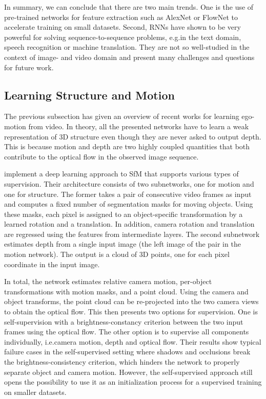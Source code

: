 			In summary, we can conclude that there are two main trends.
			One is the use of pre-trained networks for feature extraction such as AlexNet or FlowNet to accelerate training on small datasets.
			Second, RNNs have shown to be very powerful for solving sequence-to-sequence problems, e.g.\@ in the text domain, speech recognition or machine translation.
			They are not so well-studied in the context of image- and video domain and present many challenges and questions for future work.
		
		\subsection{Learning Structure and Motion}
			The previous subsection has given an overview of recent works for learning ego-motion from video.
			In theory, all the presented networks have to learn a weak representation of 3D structure even though they are never asked to output depth.
			This is because motion and depth are two highly coupled quantities that both contribute to the optical flow in the observed image sequence.
			
			\cite{SFMNET} implement a deep learning approach to SfM that supports various types of supervision. 
			Their architecture consists of two subnetworks, one for motion and one for structure.
			The former takes a pair of consecutive video frames as input and computes a fixed number of segmentation masks for moving objects. 
			Using these masks, each pixel is assigned to an object-specific transformation by a learned rotation and a translation.
			In addition, camera rotation and translation are regressed using the features from intermediate layers.
			The second subnetwork estimates depth from a single input image (the left image of the pair in the motion network). 
			The output is a cloud of 3D points, one for each pixel coordinate in the input image.
			
			In total, the network estimates relative camera motion, per-object transformations with motion masks, and a point cloud.
			Using the camera and object transforms, the point cloud can be re-projected into the two camera views to obtain the optical flow.
			This then presents two options for supervision.
			One is self-supervision with a brightness-constancy criterion between the two input frames using the optical flow.
			The other option is to supervise all components individually, i.e.\@ camera motion, depth and optical flow.
			Their results show typical failure cases in the self-supervised setting where shadows and occlusions break the brightness-consistency criterion, which hinders the network to properly separate object and camera motion.
			However, the self-supervised approach still opens the possibility to use it as an initialization process for a supervised training on smaller datasets.
		
